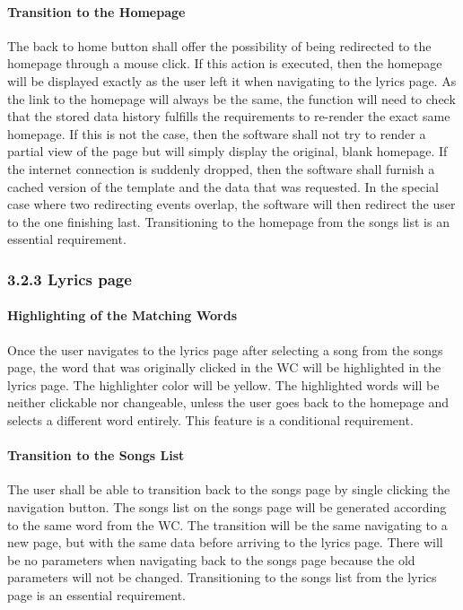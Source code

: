 \documentclass[]{article}
\begin{document}
\paragraph{Transition to the Homepage}\label{transition-to-the-homepage}

The back to home button shall offer the possibility of being redirected
to the homepage through a mouse click. If this action is executed, then
the homepage will be displayed exactly as the user left it when
navigating to the lyrics page. As the link to the homepage will always
be the same, the function will need to check that the stored data
history fulfills the requirements to re-render the exact same homepage.
If this is not the case, then the software shall not try to render a
partial view of the page but will simply display the original, blank
homepage. If the internet connection is suddenly dropped, then the
software shall furnish a cached version of the template and the data
that was requested. In the special case where two redirecting events
overlap, the software will then redirect the user to the one finishing
last. Transitioning to the homepage from the songs list is an essential
requirement.

\subsubsection{3.2.3 Lyrics page}\label{lyrics-page}

\paragraph{Highlighting of the Matching
Words}\label{highlighting-of-the-matching-words}

Once the user navigates to the lyrics page after selecting a song from
the songs page, the word that was originally clicked in the WC will be
highlighted in the lyrics page. The highlighter color will be yellow.
The highlighted words will be neither clickable nor changeable, unless
the user goes back to the homepage and selects a different word
entirely. This feature is a conditional requirement.

\paragraph{Transition to the Songs
List}\label{transition-to-the-songs-list-1}

The user shall be able to transition back to the songs page by single
clicking the navigation button. The songs list on the songs page will be
generated according to the same word from the WC. The transition will be
the same navigating to a new page, but with the same data before
arriving to the lyrics page. There will be no parameters when navigating
back to the songs page because the old parameters will not be changed.
Transitioning to the songs list from the lyrics page is an essential
requirement.
\end{document}
